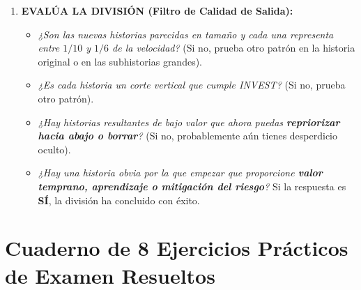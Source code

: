 \begin{enumerate}[label=\textbf{Fase \arabic*:}, leftmargin=1.9cm, itemsep=5pt]
    \item \textbf{EVALÚA LA DIVISIÓN (Filtro de Calidad de Salida):}
    \begin{itemize}[itemsep=2pt]
        \item \textit{¿Son las nuevas historias parecidas en tamaño y cada una representa entre $1/10$ y $1/6$ de la velocidad?} (Si no, prueba otro patrón en la historia original o en las subhistorias grandes).
        \item \textit{¿Es cada historia un corte vertical que cumple INVEST?} (Si no, prueba otro patrón).
        \item \textit{¿Hay historias resultantes de bajo valor que ahora puedas \textbf{repriorizar hacia abajo o borrar}?} (Si no, probablemente aún tienes desperdicio oculto).
        \item \textit{¿Hay una historia obvia por la que empezar que proporcione \textbf{valor temprano, aprendizaje o mitigación del riesgo}?} Si la respuesta es \textbf{SÍ}, la división ha concluido con éxito.
    \end{itemize}
\end{enumerate}

\section{Cuaderno de 8 Ejercicios Prácticos de Examen Resueltos}

